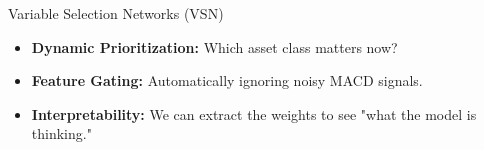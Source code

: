 \begin{frame}{Variable Selection Networks (VSN)}
    \begin{itemize}
        \item \textbf{Dynamic Prioritization:} Which asset class matters now?
        \item \textbf{Feature Gating:} Automatically ignoring noisy MACD signals.
        \item \textbf{Interpretability:} We can extract the weights to see "what the model is thinking."
    \end{itemize}
\end{frame}
